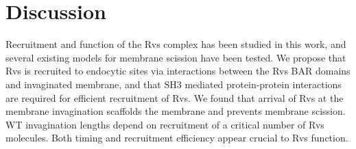 \documentclass[9pt,lineno]{elife}
\begin{document}














\section{Discussion}
Recruitment and function of the Rvs complex has been studied in this work, and several existing models for membrane scission have been tested. We propose that Rvs is recruited to endocytic sites via interactions between the Rvs BAR domains and invaginated membrane, and that SH3 mediated protein-protein interactions are required for efficient recruitment of Rvs. We found that arrival of Rvs at the membrane invagination scaffolds the membrane and prevents membrane scission. WT invagination lengths depend on recruitment of a critical number of Rvs molecules. Both timing and recruitment efficiency appear crucial to Rvs function.
\end{document}
